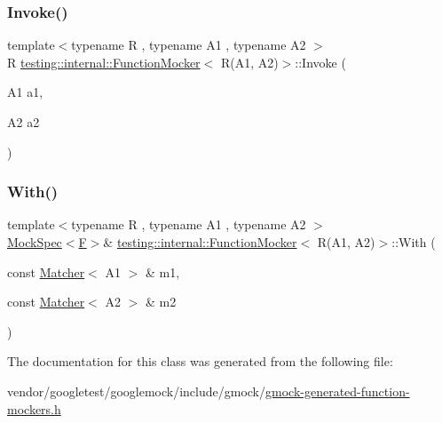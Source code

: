 \subsubsection{\texorpdfstring{Invoke()}{Invoke()}}
{\footnotesize\ttfamily template$<$typename R , typename A1 , typename A2 $>$ \\
R \hyperlink{classtesting_1_1internal_1_1_function_mocker}{testing\+::internal\+::\+Function\+Mocker}$<$ R(A1, A2)$>$\+::Invoke (\begin{DoxyParamCaption}\item[{A1}]{a1,  }\item[{A2}]{a2 }\end{DoxyParamCaption})\hspace{0.3cm}{\ttfamily [inline]}}

\mbox{\label{classtesting_1_1internal_1_1_function_mocker_3_01_r_07_a1_00_01_a2_08_4_a7e17361fadc89120c1254826baa3200e}} 
\subsubsection{\texorpdfstring{With()}{With()}}
{\footnotesize\ttfamily template$<$typename R , typename A1 , typename A2 $>$ \\
\hyperlink{classtesting_1_1internal_1_1_mock_spec}{Mock\+Spec}$<$\hyperlink{classtesting_1_1internal_1_1_function_mocker_3_01_r_07_a1_00_01_a2_08_4_a61302610bfc9b30588ea345e468310b2}{F}$>$\& \hyperlink{classtesting_1_1internal_1_1_function_mocker}{testing\+::internal\+::\+Function\+Mocker}$<$ R(A1, A2)$>$\+::With (\begin{DoxyParamCaption}\item[{const \hyperlink{classtesting_1_1_matcher}{Matcher}$<$ A1 $>$ \&}]{m1,  }\item[{const \hyperlink{classtesting_1_1_matcher}{Matcher}$<$ A2 $>$ \&}]{m2 }\end{DoxyParamCaption})\hspace{0.3cm}{\ttfamily [inline]}}



The documentation for this class was generated from the following file\+:\begin{DoxyCompactItemize}
\item 
vendor/googletest/googlemock/include/gmock/\hyperlink{gmock-generated-function-mockers_8h}{gmock-\/generated-\/function-\/mockers.\+h}\end{DoxyCompactItemize}
